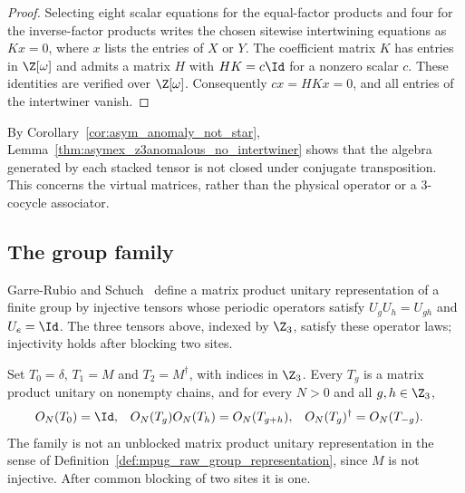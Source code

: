 \begin{proof}
    \leanok
    Selecting eight scalar equations for the equal-factor products and
    four for the inverse-factor products writes the chosen sitewise
    intertwining equations as $Kx=0$, where $x$ lists
    the entries of $X$ or $Y$. The coefficient matrix $K$ has entries in
    $\Z[\omega]$ and admits a matrix $H$ with $HK=c\Id$ for a nonzero
    scalar $c$. These identities are verified over $\Z[\omega]$.
    Consequently $cx=HKx=0$, and all entries of the intertwiner vanish.
\end{proof}

\begin{remark}
    \label{rem:asymex_z3anomalous_anomaly}
    By Corollary~\ref{cor:asym_anomaly_not_star},
    Lemma~\ref{thm:asymex_z3anomalous_no_intertwiner} shows that the
    algebra generated by each stacked tensor is not closed under
    conjugate transposition. This concerns the virtual matrices, rather than
    the physical operator or a $3$-cocycle associator.
\end{remark}

\subsection{The group family}%
\label{sec:asymex_z3anomalous_family}

Garre-Rubio and Schuch~\cite[Section~IV.A]{GarreRubioSchuch2024DomainWall}
define a matrix product unitary representation of a finite group by
injective tensors whose periodic operators satisfy $U_gU_h=U_{gh}$ and
$U_e=\Id$. The three tensors above, indexed by $\Z_3$, satisfy these
operator laws; injectivity holds after blocking two sites.

\begin{lemma}
    \label{thm:asymex_z3anomalous_family}
    \leanok
    Set $T_0=\delta$, $T_1=M$ and $T_2=M^\dagger$, with indices in $\Z_3$.
    Every $T_g$ is a matrix product unitary on nonempty chains, and for
    every $N>0$ and all $g,h\in\Z_3$,
    \begin{align}
        O_N(T_0)         & =\Id,          &
        O_N(T_g)O_N(T_h) & =O_N(T_{g+h}), &
        O_N(T_g)^\dagger & =O_N(T_{-g}).
        \notag
    \end{align}
    The family is not an unblocked matrix product unitary representation in the
    sense of Definition~\ref{def:mpug_raw_group_representation}, since
    $M$ is not injective. After common blocking of two sites it is one.
\end{lemma}

